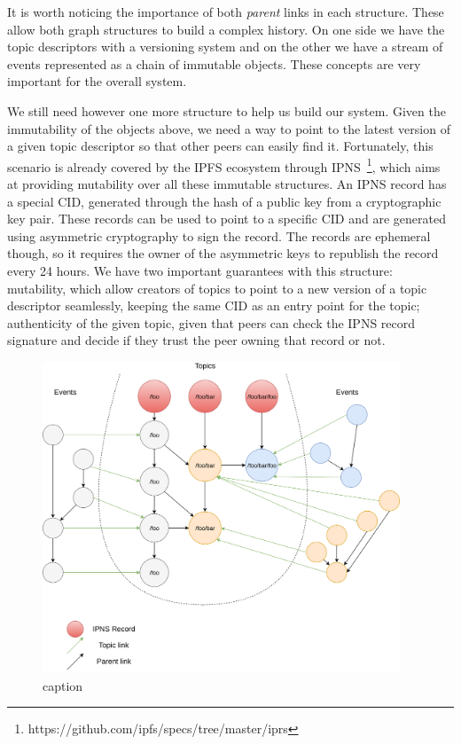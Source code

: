 It is worth noticing the importance of both \emph{parent} links in each
structure. These allow both graph structures to build a complex history.
On one side we have the topic descriptors with a versioning system and
on the other we have a stream of events represented as a chain of
immutable objects. These concepts are very important for the overall
system.

We still need however one more structure to help us build our system.
Given the immutability of the objects above, we need a way to point to
the latest version of a given topic descriptor so that other peers can
easily find it. Fortunately, this scenario is already covered by the
IPFS ecosystem through IPNS~\footnote{https://github.com/ipfs/specs/tree/master/iprs}, which aims at
providing mutability over all these immutable structures. An IPNS record
has a special CID, generated through the hash of a public key from a
cryptographic key pair. These records can be used to point to a specific
CID and are generated using asymmetric cryptography to sign the record.
The records are ephemeral though, so it requires the owner of the
asymmetric keys to republish the record every 24 hours. We have two
important guarantees with this structure: mutability, which allow
creators of topics to point to a new version of a topic descriptor
seamlessly, keeping the same CID as an entry point for the topic;
authenticity of the given topic, given that peers can check the IPNS
record signature and decide if they trust the peer owning that record or
not.

\begin{figure}[hb!]
  \centering
  \includegraphics[width=0.95\textwidth]{img/solution-arch.png}
  \caption{caption}
  \label{fig:solution-arch}
\end{figure}

